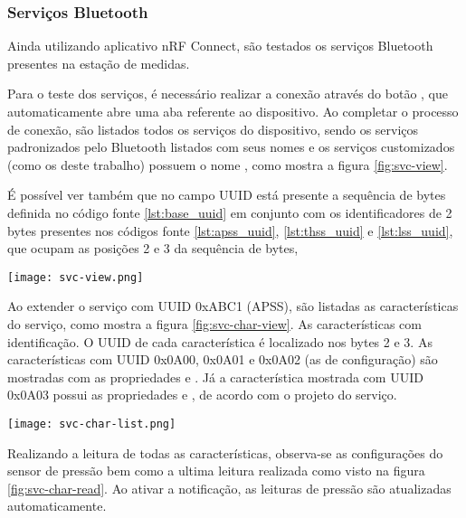 \subsubsection{Serviços Bluetooth}

Ainda utilizando aplicativo nRF Connect, são testados os serviços Bluetooth
presentes na estação de medidas.

Para o teste dos serviços, é necessário realizar a conexão através do botão
, que automaticamente abre uma aba referente ao dispositivo.
Ao completar o processo de conexão, são listados todos os serviços do
dispositivo, sendo os serviços padronizados pelo Bluetooth listados com seus
nomes e os serviços customizados (como os deste trabalho) possuem o nome
, como mostra a figura \ref{fig:svc-view}.

É possível ver também que no campo UUID está presente a sequência de bytes
definida no código fonte \ref{lst:base_uuid} em conjunto com os identificadores
de 2 bytes presentes nos códigos fonte \ref{lst:apss_uuid}, \ref{lst:thss_uuid}
e \ref{lst:lss_uuid}, que ocupam as posições 2 e 3 da sequência de bytes,

\begin{center}
	\centering 
	\texttt{[image: svc-view.png]}
	\label{fig:svc-view}
\end{center} 

Ao extender o serviço com UUID 0xABC1 (APSS), são listadas as características do
serviço, como mostra a figura \ref{fig:svc-char-view}. As características com
identificação. O UUID de cada característica é localizado nos bytes 2 e 3. As
características com UUID 0x0A00, 0x0A01 e 0x0A02 (as de configuração) são
mostradas com as propriedades  e . Já a
característica mostrada com UUID 0x0A03 possui as propriedades  e
, de acordo com o projeto do serviço.

\begin{center}
	\centering 
	\texttt{[image: svc-char-list.png]} 
	\label{fig:svc-char-view}
\end{center} 

Realizando a leitura de todas as características, observa-se as configurações do
sensor de pressão bem como a ultima leitura realizada como visto na figura
\ref{fig:svc-char-read}. Ao ativar a notificação, as leituras de pressão são
atualizadas automaticamente.

